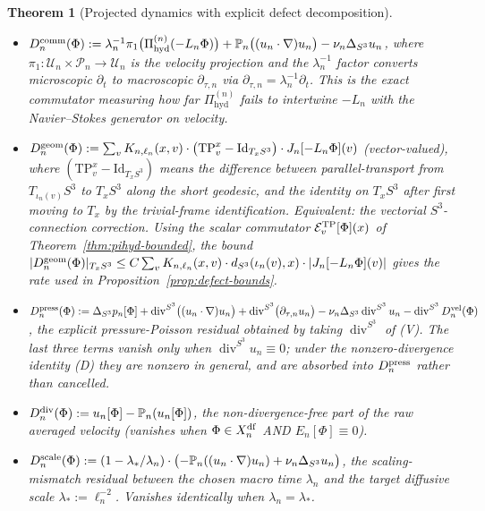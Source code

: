 \documentclass[11pt, a4paper]{amsart}
\newtheorem{theorem}{Theorem}[section]
\theoremstyle{definition}
\newcommand{\dsph}{d_{S^3}}
\newcommand{\Pihyd}{\Pi_{\mathrm{hyd}}}
\newcommand{\divS}{\operatorname{div}^{S^3}}
\newcommand{\LapS}{\Delta_{S^3}}
\newcommand{\Projn}{\mathbb P_n}
\begin{document}
\begin{theorem}[Projected dynamics with explicit defect decomposition]
\begin{itemize}
\item $D_n^{\rm comm}(\Phi) :=
  \lambda_n^{-1}\pi_1\bigl(\Pihyd^{(n)}(-L_n \Phi)\bigr) + \Projn\bigl((u_n
  \cdot \nabla) u_n\bigr) - \nu_n \LapS u_n$, where
  $\pi_1 \colon \mathcal U_n \times \mathcal P_n \to \mathcal
  U_n$ is the velocity projection and the $\lambda_n^{-1}$ factor
  converts microscopic $\partial_t$ to macroscopic
  $\partial_{\tau,n}$ via $\partial_{\tau,n} = \lambda_n^{-1}
  \partial_t$. This is the exact commutator measuring how far
  $\Pihyd^{(n)}$ fails to intertwine $-L_n$ with the
  Navier--Stokes generator on velocity.
\item $D_n^{\rm geom}(\Phi) := \sum_v K_{n,\ell_n}(x, v)
  \cdot \bigl(\mathrm{TP}_v^x - \mathrm{Id}_{T_x S^3}\bigr) \cdot
  J_n[-L_n \Phi](v)$ (vector-valued), where $(\mathrm{TP}_v^x -
  \mathrm{Id}_{T_x S^3})$ means the difference between
  parallel-transport from $T_{\iota_n(v)} S^3$ to $T_x S^3$
  along the short geodesic, and the identity on $T_x S^3$ after
  first moving to $T_x$ by the trivial-frame identification.
  Equivalent: the vectorial $S^3$-connection correction. Using
  the scalar commutator $\mathcal E^{\rm TP}_v[\Phi](x)$ of
  Theorem~\ref{thm:pihyd-bounded}, the bound
  $|D_n^{\rm geom}(\Phi)|_{T_x S^3} \leq C\sum_v K_{n,\ell_n}(x,v)
  \cdot \dsph(\iota_n(v), x) \cdot |J_n[-L_n\Phi](v)|$ gives
  the rate used in Proposition~\ref{prop:defect-bounds}.
\item $D_n^{\rm press}(\Phi) := \LapS p_n[\Phi] + \divS
  \bigl((u_n \cdot \nabla) u_n\bigr) + \divS\bigl(\partial_{\tau,n}
  u_n\bigr) - \nu_n \LapS \divS u_n - \divS D_n^{\rm vel}(\Phi)$,
  the explicit pressure-Poisson residual obtained by taking
  $\divS$ of (V). The last three terms vanish only when
  $\divS u_n \equiv 0$; under the nonzero-divergence identity
  (D) they are nonzero in general, and are absorbed into
  $D_n^{\rm press}$ rather than cancelled.
\item $D_n^{\rm div}(\Phi) := u_n[\Phi] - \Projn(u_n[\Phi])$,
  the non-divergence-free part of the raw averaged velocity
  (vanishes when $\Phi \in X_n^{\rm df}$ AND $E_n[\Phi] \equiv 0$).
\item $D_n^{\rm scale}(\Phi) := (1 - \lambda_\ast/\lambda_n)
  \cdot \bigl(-\Projn((u_n \cdot \nabla) u_n) + \nu_n \LapS
  u_n\bigr)$, the scaling-mismatch residual between the chosen
  macro time $\lambda_n$ and the target diffusive scale
  $\lambda_\ast := \ell_n^{-2}$. Vanishes identically when
  $\lambda_n = \lambda_\ast$.
\end{itemize}


\end{theorem}
\end{document}
